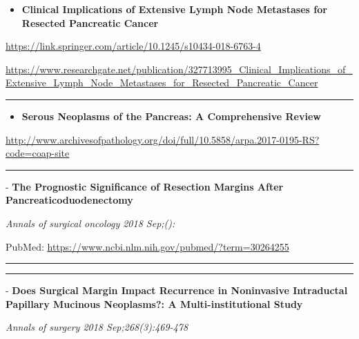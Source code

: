 \documentclass[]{article}
\providecommand{\tightlist}{%
  \setlength{\itemsep}{0pt}\setlength{\parskip}{0pt}}
\begin{document}
\begin{itemize}
\tightlist
\item
  \textbf{Clinical Implications of Extensive Lymph Node Metastases for
  Resected Pancreatic Cancer}
\end{itemize}

\url{https://link.springer.com/article/10.1245/s10434-018-6763-4}

\url{https://www.researchgate.net/publication/327713995_Clinical_Implications_of_Extensive_Lymph_Node_Metastases_for_Resected_Pancreatic_Cancer}

\begin{center}\rule{0.5\linewidth}{\linethickness}\end{center}

\begin{itemize}
\tightlist
\item
  \textbf{Serous Neoplasms of the Pancreas: A Comprehensive Review}
\end{itemize}

\url{http://www.archivesofpathology.org/doi/full/10.5858/arpa.2017-0195-RS?code=coap-site}

\begin{center}\rule{0.5\linewidth}{\linethickness}\end{center}

 - \textbf{The Prognostic Significance of Resection Margins After
Pancreaticoduodenectomy}

\emph{Annals of surgical oncology 2018 Sep;():}

PubMed: \url{https://www.ncbi.nlm.nih.gov/pubmed/?term=30264255}

{}

{}

\begin{center}\rule{0.5\linewidth}{\linethickness}\end{center}

\begin{center}\rule{0.5\linewidth}{\linethickness}\end{center}

 - \textbf{Does Surgical Margin Impact Recurrence in Noninvasive
Intraductal Papillary Mucinous Neoplasms?: A Multi-institutional Study}

\emph{Annals of surgery 2018 Sep;268(3):469-478}
\end{document}
